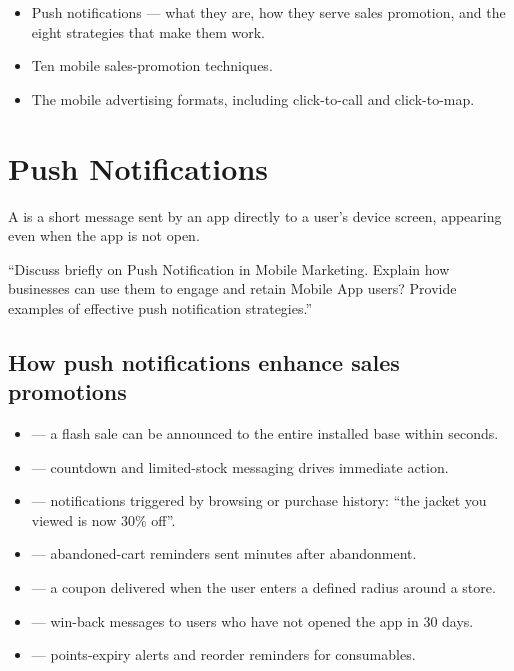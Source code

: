 
\begin{learningoutcomes}
\begin{itemize}
\item Push notifications --- what they are, how they serve sales promotion, and
      the eight strategies that make them work.
\item Ten mobile sales-promotion techniques.
\item The mobile advertising formats, including click-to-call and click-to-map.
\end{itemize}
\end{learningoutcomes}

\section{Push Notifications}

\begin{definitionbox}
A  is a short message sent by an
app directly to a user's device screen, appearing even when the app is not open.
\end{definitionbox}

\begin{keybox}
``Discuss briefly on Push Notification in Mobile Marketing. Explain how
businesses can use them to engage and retain Mobile App users? Provide examples
of effective push notification strategies.''
\end{keybox}

\subsection{How push notifications enhance sales promotions}

\begin{itemize}
\item {} --- a flash sale can be announced to the entire installed
      base within seconds.
\item {} --- countdown and limited-stock messaging drives immediate
      action.
\item {} --- notifications triggered by browsing or purchase
      history: ``the jacket you viewed is now 30\% off''.
\item {} --- abandoned-cart reminders sent minutes after
      abandonment.
\item {} --- a coupon delivered when the user enters a
      defined radius around a store.
\item {} --- win-back messages to users who have not opened the
      app in 30 days.
\item {} --- points-expiry alerts and reorder
      reminders for consumables.
\end{itemize}

